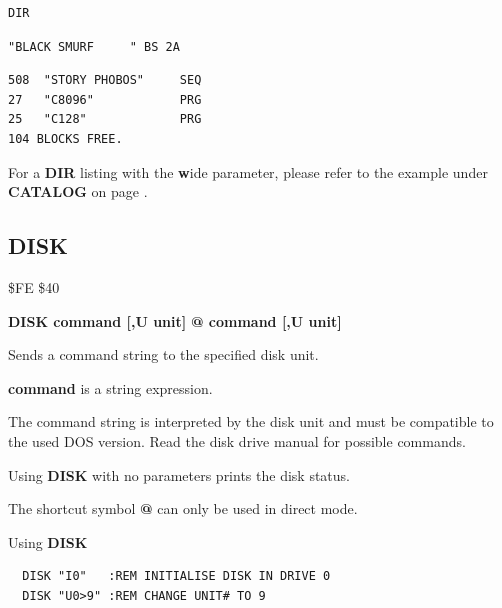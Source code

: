 \begin{description}[leftmargin=2cm,style=nextline]
\begin{tcolorbox}[colback=black,coltext=white]
\verbatimfont{\codefont}
\begin{verbatim}
DIR
\end{verbatim}
\selectfont{\codefont 0}
\begin{tcolorbox}[colback=white,coltext=black,arc=0mm,boxrule=0mm,
       left*=0.5mm,right*=0mm,top=0mm,bottom=0mm,nobeforeafter,
       left skip=0.5mm,
       width=28mm,height=3mm,valign=center]
\begin{verbatim}
"BLACK SMURF     " BS 2A
\end{verbatim}
\end{tcolorbox}
\begin{verbatim}
508  "STORY PHOBOS"     SEQ
27   "C8096"            PRG
25   "C128"             PRG
104 BLOCKS FREE.
\end{verbatim}
\end{tcolorbox}

For a {\bf DIR} listing with the {\bf w}ide parameter, please refer to the example under {\bf CATALOG}
on page \pageref{3columndirlisting}.

\end{description}


\newpage
\subsection{DISK}
\begin{description}[leftmargin=2cm,style=nextline]
\item [Token:] \$FE \$40
\item [Format:] {\bf DISK command [,U unit] }
                {\bf @ command [,U unit] }
\item [Usage:]

   Sends a command string to the specified disk unit.

   \unitdefinition

   {\bf command} is a string expression.

\item [Remarks:]
   The command string is interpreted by the disk unit
   and must be compatible to the used DOS version.
   Read the disk drive manual for possible commands.

   Using {\bf DISK} with no parameters prints the disk status.

   The shortcut symbol {\bf @} can only be used in direct mode.

\item [Examples:] Using {\bf DISK}
\begin{tcolorbox}[colback=black,coltext=white]
\verbatimfont{\codefont}
\begin{verbatim}
  DISK "I0"   :REM INITIALISE DISK IN DRIVE 0
  DISK "U0>9" :REM CHANGE UNIT# TO 9
\end{verbatim}
\end{tcolorbox}
\end{description}

